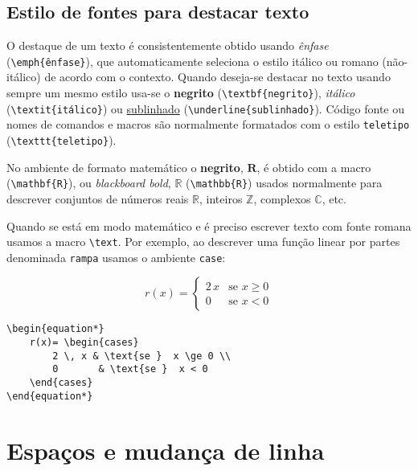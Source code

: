 \subsection{Estilo de fontes para  destacar texto}

O destaque de um texto é consistentemente obtido usando   \emph{ênfase} (\verb|\emph{ênfase}|), que automaticamente seleciona o estilo itálico ou romano (não-itálico) de acordo com o contexto. Quando deseja-se destacar  no texto usando sempre um mesmo estilo usa-se  o   \textbf{negrito} (\verb|\textbf{negrito}|),  \textit{itálico} (\verb|\textit{itálico}|) ou \underline{sublinhado} (\verb|\underline{sublinhado}|). Código fonte ou nomes de comandos e macros são normalmente formatados com o estilo \texttt{teletipo} (\verb|\texttt{teletipo}|).

No ambiente de formato matemático o \textbf{negrito}, $\mathbf{R}$, é obtido com a macro (\verb|\mathbf{R}|), ou \emph{blackboard bold}, $\mathbb{R}$ (\verb|\mathbb{R}|) usados normalmente para descrever conjuntos de números reais $\mathbb{R}$, inteiros $\mathbb{Z}$, complexos $\mathbb{C}$, etc. 

Quando se está em modo matemático e é preciso escrever texto com fonte romana usamos a macro \verb|\text|.  Por exemplo, ao descrever uma função linear por partes denominada \texttt{rampa} usamos o ambiente \verb|case|:

\begin{multicols}{2}
\begin{equation*}
	r(x)= \begin{cases}
		2\,x & \text{se }  x \ge 0 \\
		0 & \text{se }  x < 0
	\end{cases}
\end{equation*}
	\vfill\null 
	\columnbreak
	\begin{lstlisting}[language={[Latex]Tex},frame=single]
\begin{equation*}
	r(x)= \begin{cases}
		2 \, x & \text{se }  x \ge 0 \\
		0       & \text{se }  x < 0
	\end{cases}
\end{equation*}
	\end{lstlisting}
\end{multicols}

\section{Espaços e mudança de linha}

